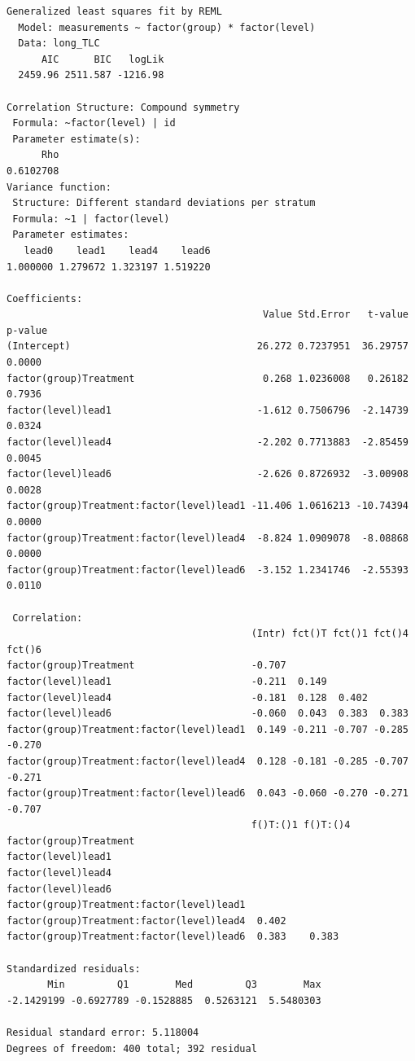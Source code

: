 \documentclass[
  letterpaper,
  DIV=11,
  numbers=noendperiod]{scrreprt}
\begin{document}
\begin{verbatim}
Generalized least squares fit by REML
  Model: measurements ~ factor(group) * factor(level) 
  Data: long_TLC 
      AIC      BIC   logLik
  2459.96 2511.587 -1216.98

Correlation Structure: Compound symmetry
 Formula: ~factor(level) | id 
 Parameter estimate(s):
      Rho 
0.6102708 
Variance function:
 Structure: Different standard deviations per stratum
 Formula: ~1 | factor(level) 
 Parameter estimates:
   lead0    lead1    lead4    lead6 
1.000000 1.279672 1.323197 1.519220 

Coefficients:
                                            Value Std.Error   t-value p-value
(Intercept)                                26.272 0.7237951  36.29757  0.0000
factor(group)Treatment                      0.268 1.0236008   0.26182  0.7936
factor(level)lead1                         -1.612 0.7506796  -2.14739  0.0324
factor(level)lead4                         -2.202 0.7713883  -2.85459  0.0045
factor(level)lead6                         -2.626 0.8726932  -3.00908  0.0028
factor(group)Treatment:factor(level)lead1 -11.406 1.0616213 -10.74394  0.0000
factor(group)Treatment:factor(level)lead4  -8.824 1.0909078  -8.08868  0.0000
factor(group)Treatment:factor(level)lead6  -3.152 1.2341746  -2.55393  0.0110

 Correlation: 
                                          (Intr) fct()T fct()1 fct()4 fct()6
factor(group)Treatment                    -0.707                            
factor(level)lead1                        -0.211  0.149                     
factor(level)lead4                        -0.181  0.128  0.402              
factor(level)lead6                        -0.060  0.043  0.383  0.383       
factor(group)Treatment:factor(level)lead1  0.149 -0.211 -0.707 -0.285 -0.270
factor(group)Treatment:factor(level)lead4  0.128 -0.181 -0.285 -0.707 -0.271
factor(group)Treatment:factor(level)lead6  0.043 -0.060 -0.270 -0.271 -0.707
                                          f()T:()1 f()T:()4
factor(group)Treatment                                     
factor(level)lead1                                         
factor(level)lead4                                         
factor(level)lead6                                         
factor(group)Treatment:factor(level)lead1                  
factor(group)Treatment:factor(level)lead4  0.402           
factor(group)Treatment:factor(level)lead6  0.383    0.383  

Standardized residuals:
       Min         Q1        Med         Q3        Max 
-2.1429199 -0.6927789 -0.1528885  0.5263121  5.5480303 

Residual standard error: 5.118004 
Degrees of freedom: 400 total; 392 residual
\end{verbatim}
\end{document}
